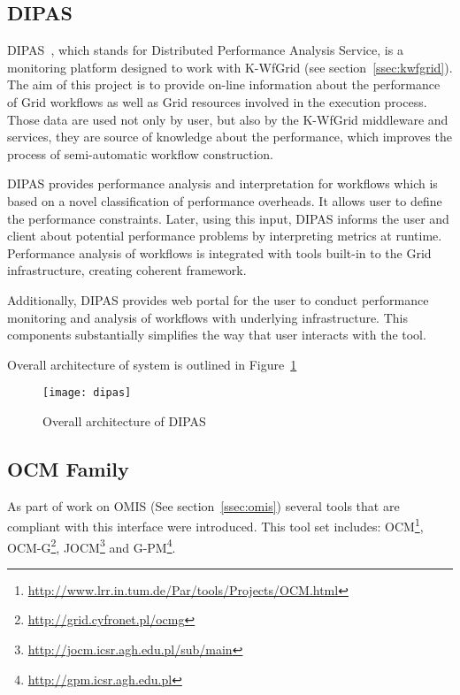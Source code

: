 
\subsection{DIPAS}

DIPAS~\cite{DIPAS}, which stands for Distributed Performance Analysis Service, is a monitoring platform designed to work with K-WfGrid (see section~\ref{ssec:kwfgrid}). The aim of this project is to provide on-line information about the performance of Grid workflows as well as Grid resources involved in the execution process. Those data are used not only by user, but also by the K-WfGrid middleware and services, they are source of knowledge about the performance, which improves the process of semi-automatic workflow construction.

DIPAS provides performance analysis and interpretation for workflows which is based on a novel classification of performance overheads. It allows user to define the performance constraints. Later, using this input, DIPAS informs the user and client about potential performance problems by interpreting metrics at runtime. Performance analysis of workflows is integrated with tools built-in to the Grid infrastructure, creating coherent framework. 

Additionally, DIPAS provides web portal for the user to conduct performance monitoring and analysis of workflows with underlying infrastructure. This components substantially simplifies the way that user interacts with the tool. 

Overall architecture of system is outlined in Figure~\ref{fig:dipas}

\begin{figure}[ht]
	\centering
	\texttt{[image: dipas]}
	\caption{Overall architecture of DIPAS}
	\label{fig:dipas}
\end{figure}


\subsection{OCM Family}

As part of work on OMIS (See section~\ref{ssec:omis}) several tools that are compliant with this interface were introduced. This tool set includes: OCM\footnote{\url{http://www.lrr.in.tum.de/Par/tools/Projects/OCM.html}}, OCM-G\footnote{\url{http://grid.cyfronet.pl/ocmg}}, JOCM\footnote{\url{http://jocm.icsr.agh.edu.pl/sub/main}} and G-PM\footnote{\url{http://gpm.icsr.agh.edu.pl}}.

